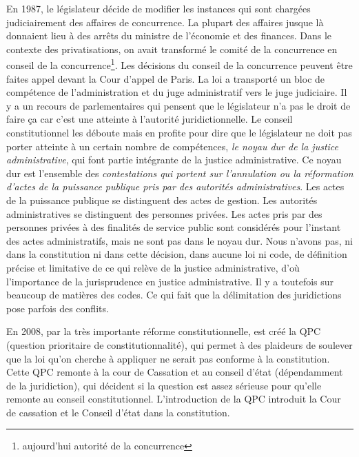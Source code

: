 \documentclass[math]{cours}
\begin{document}
En 1987, le législateur décide de modifier les instances qui sont chargées judiciairement des affaires de concurrence.
La plupart des affaires jusque là donnaient lieu à des arrêts du ministre de l'économie et des finances.
Dans le contexte des privatisations, on avait transformé le comité de la concurrence en conseil de la concurrence\footnote{aujourd'hui autorité de la concurrence}.
Les décisions du conseil de la concurrence peuvent être faites appel devant la Cour d'appel de Paris.
La loi a transporté un bloc de compétence de l'administration et du juge administratif vers le juge judiciaire.
Il y a un recours de parlementaires qui pensent que le législateur n'a pas le droit de faire ça car c'est une atteinte à l'autorité juridictionnelle.
Le conseil constitutionnel les déboute mais en profite pour dire que le législateur ne doit pas porter atteinte à un certain nombre de compétences, \textit{le noyau dur de la justice administrative}, qui font partie intégrante de la justice administrative.
Ce noyau dur est l'ensemble des \textit{contestations qui portent sur l'annulation ou la réformation d'actes de la puissance publique pris par des autorités administratives}.
Les actes de la puissance publique se distinguent des actes de gestion.
Les autorités administratives se distinguent des personnes privées.
Les actes pris par des personnes privées à des finalités de service public sont considérés pour l'instant des actes administratifs, mais ne sont pas dans le noyau dur.
Nous n'avons pas, ni dans la constitution ni dans cette décision, dans aucune loi ni code, de définition précise et limitative de ce qui relève de la justice administrative,
d'où l'importance de la jurisprudence en justice administrative.
Il y a toutefois sur beaucoup de matières des codes.
Ce qui fait que la délimitation des juridictions pose parfois des conflits.

En 2008, par la très importante réforme constitutionnelle, est créé la QPC (question prioritaire de constitutionnalité), qui permet à des plaideurs de soulever que la loi qu'on cherche à appliquer ne serait pas conforme à la constitution.
Cette QPC remonte à la cour de Cassation et au conseil d'état (dépendamment de la juridiction), qui décident si la question est assez sérieuse pour qu'elle remonte au conseil constitutionnel.
L'introduction de la QPC introduit la Cour de cassation et le Conseil d'état dans la constitution.
\end{document}

